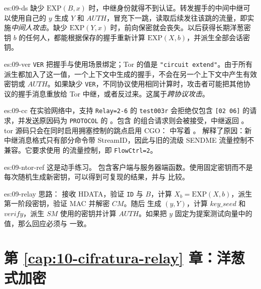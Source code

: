 \begin{soluzione}{es:09-ds}
缺少 $\mathrm{EXP}(B,x)$ 时，中继身份就得不到认证。转发握手的中间中继可以使用自己的 $y$ 生成 $Y$ 和 $\mathit{AUTH}$，冒充下一跳，读取后续发往该跳的流量，即实施\emph{中间人攻击}。缺少 $\mathrm{EXP}(Y,x)$ 时，前向保密就会丧失。以后获得长期洋葱密钥 $b$ 的任何人，都能根据保存的握手重新计算 $\mathrm{EXP}(X,b)$，并派生全部会话密钥。
\end{soluzione}

\begin{soluzione}{es:09-ver}
\texttt{VER} 把握手与使用场景绑定；Tor 的值是 \texttt{"circuit extend"}。由于所有派生都加入了这一值，一个上下文中生成的握手，不会在另一个上下文中产生有效密钥或 $\mathit{AUTH}$。如果缺少 \texttt{VER}，不同协议使用相同计算时，攻击者可能把其他协议的握手消息重放给 Tor 中继，或者反过来。这属于\emph{跨协议攻击}。
\end{soluzione}

\begin{soluzione}{es:09-cc}
在实验网络中，支持 \texttt{Relay=2-6} 的 \texttt{test003r} 会拒绝仅包含 \texttt{[02 06]} 的请求，并发送原因码为 \texttt{PROTOCOL} 的 。包含  的组合请求则会被接受，中继返回 。tor 源码只会在同时启用拥塞控制的跳点启用 CGO： 中写着 。 解释了原因：新中继消息格式只有部分命令带 StreamID，因此与旧的流级 SENDME 流量控制不兼容。它要求使用  的流量控制，即 \texttt{FlowCtrl=2}。
\end{soluzione}

\begin{soluzione}{es:09-ntor-ref}
这是动手练习。 包含客户端与服务器端函数。使用固定密钥而不是每次随机生成新密钥，可以得到可复现的结果，并与  比较。
\end{soluzione}

\begin{soluzione}{es:09-relay}
思路： 接收 HDATA，验证 \texttt{ID} 与 $B$，计算 $X_b=\mathrm{EXP}(X,b)$，派生第一阶段密钥，验证 MAC 并解密 $CM$。随后  生成 $(y,Y)$，计算 $\mathit{key\_seed}$ 和 $\mathit{verify}$，派生 $SM$ 使用的密钥并计算 $\mathit{AUTH}$。如果把 $y$ 固定为提案测试向量中的值，那么回应必须与  一致。
\end{soluzione}

\section*{第 \ref{cap:10-cifratura-relay} 章：洋葱式加密}

